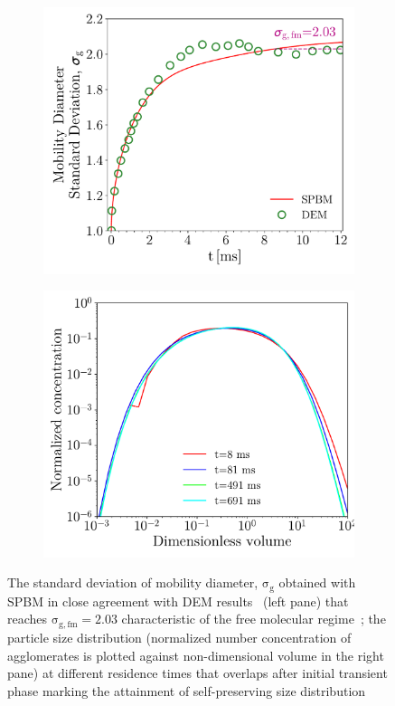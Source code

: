 \begin{figure}[!htbp]
	\centering
	\begin{subfigure}[t]{0.47\textwidth}
		\centering
		\includegraphics[width=1\textwidth]{Figures/Results/Validation/Coagulation/sigmag.pdf}
	\end{subfigure}
	\begin{subfigure}[t]{0.47\textwidth}
		\centering
		\includegraphics[width=1\textwidth]{Figures/Results/Validation/Coagulation/PSD.pdf}
	\end{subfigure}
	\caption{The standard deviation of mobility diameter, $\mathrm{\sigma_g}$ obtained with SPBM in close agreement with DEM results~\citep{kholghy2021surface} (left pane) that reaches $\mathrm{\sigma_{g,fm}=2.03}$ characteristic of the free molecular regime~\citep{vemury1995self}; the particle size distribution (normalized number concentration of agglomerates is plotted against non-dimensional volume in the right pane) at different residence times that overlaps after initial transient phase marking the attainment of self-preserving size distribution}
	\label{fig:coagvalid_sigmapsd}
\end{figure}

